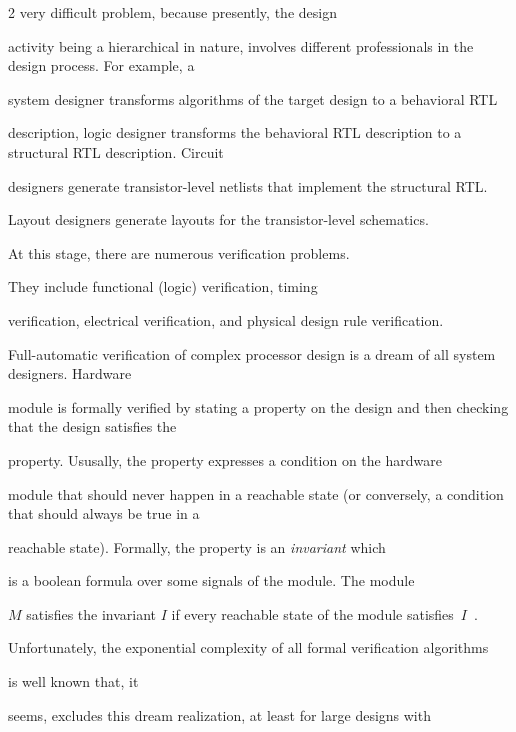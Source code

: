 \begin{multicols}{2}
very difficult problem, because presently, the design


activity being a hierarchical in nature, involves different professionals in the design process. For example, a


system designer transforms algorithms of the target design to a behavioral RTL


description, logic designer transforms the behavioral RTL description to a structural RTL description. Circuit


designers generate transistor-\linebreak level netlists that implement the structural RTL.\linebreak 


Layout designers generate layouts for the transistor-level schematics. 





At this stage, there are numerous verification problems.


They include functional (logic) verification, timing


verification, electrical verification, and physical design rule verification.





    Full-automatic verification of complex processor design is a dream of all system designers. Hardware


module is formally verified by stating a property on the design and then checking that the design satisfies the


property. Ususally, the property expresses a condition on the hardware


module that should never happen in a reachable state (or conversely, a condition that should always be true in a


reachable state). Formally, the property is an \textit{invariant} which


is a boolean formula over some signals of the module. The module


$M$ satisfies the invariant $I$ if every reachable state of the module satisfies~$I$~\cite{2bar}.





   Unfortunately, the exponential complexity of all formal verification algorithms


is well known that, it


seems, excludes this dream realization, at least for large designs with



\end{multicols}
